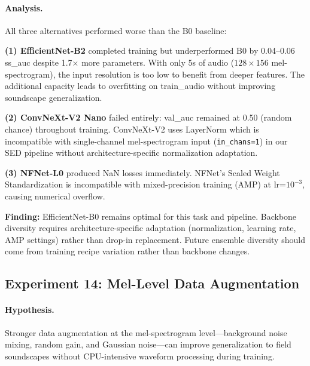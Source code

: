\paragraph{Analysis.}
All three alternatives performed worse than the B0 baseline:

\textbf{(1) EfficientNet-B2} completed training but underperformed B0 by
0.04--0.06 ss\_auc despite 1.7$\times$ more parameters. With only 5s of audio
($128 \times 156$ mel-spectrogram), the input resolution is too low to benefit
from deeper features. The additional capacity leads to overfitting on
train\_audio without improving soundscape generalization.

\textbf{(2) ConvNeXt-V2 Nano} failed entirely: val\_auc remained at 0.50
(random chance) throughout training. ConvNeXt-V2 uses LayerNorm which
is incompatible with single-channel mel-spectrogram input (\texttt{in\_chans=1})
in our SED pipeline without architecture-specific normalization adaptation.

\textbf{(3) NFNet-L0} produced NaN losses immediately. NFNet's Scaled Weight
Standardization is incompatible with mixed-precision training (AMP) at
lr=$10^{-3}$, causing numerical overflow.

\textbf{Finding:} EfficientNet-B0 remains optimal for this task and pipeline.
Backbone diversity requires architecture-specific adaptation (normalization,
learning rate, AMP settings) rather than drop-in replacement. Future ensemble
diversity should come from training recipe variation rather than backbone changes.

\subsection{Experiment 14: Mel-Level Data Augmentation}
\label{sec:exp14}

\paragraph{Hypothesis.}
Stronger data augmentation at the mel-spectrogram level---background noise
mixing, random gain, and Gaussian noise---can improve generalization to
field soundscapes without CPU-intensive waveform processing during training.

